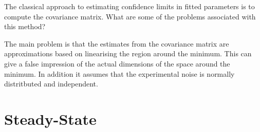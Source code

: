 \documentclass[12pt]{article}
\begin{document}
\begin{question}
The classical approach to estimating confidence limits in fitted parameters is to compute the covariance matrix. What are some of the problems associated with this method?
\end{question}
\begin{solution}
The main problem is that the estimates from the covariance matrix are approximations based on linearising the region around the minimum. This can give a false impression of the actual dimensions of the space around the minimum. In addition it assumes that the experimental noise is normally distritbuted and independent.
\end{solution}




\section{Steady-State}
\end{document}
